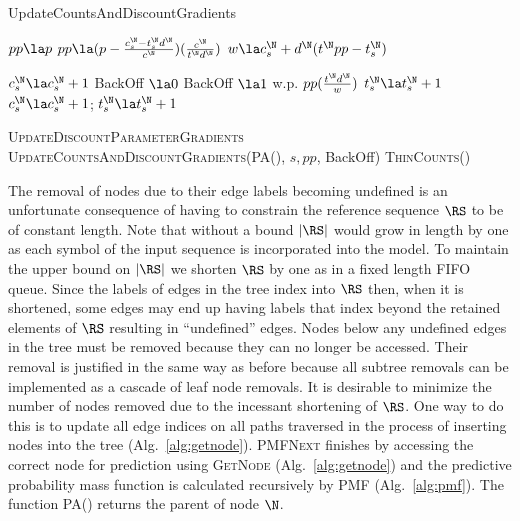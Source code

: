 \begin{algorithm}[t!]
	\caption{UpdateCountsAndDiscountGradients} \label{alg:updatecountsandgradients}
	\begin{algorithmic}[1]
	
		\State $pp \la p$
			\State $pp \la (p - \frac{c^\N_s - t^\N_s d^{\N}}{c^\N})(\frac{c^\N}{t^\N d^{\N}})$
			\State $w \la c^\N_s	+ d^\N (t^\N pp   - t^\N_s)$		
		\EndIf
		
			\State $c^\N_s \la c^\N_s + 1$
			\State BackOff $\la 0$
			\State BackOff $\la 1$ w.p. $pp (\frac{t^\N d^{\N}}{w})$ 
				\State $t^\N_s \la t^\N_s + 1$
			 \EndIf
				\State $c^\N_s \la c^\N_s + 1$;  $t^\N_s \la t^\N_s + 1$
		\EndIf
		
		\State \textsc{UpdateDiscountParameterGradients}%
		\State \textsc{UpdateCountsAndDiscountGradients}(\textsc{PA}(\N), $s,pp$, BackOff)
		\State \textsc{ThinCounts}(\N)
	\EndFunction
		\end{algorithmic}
\end{algorithm}


The removal of nodes due to their edge labels becoming undefined is an unfortunate consequence of having to constrain the reference sequence $\RS$ to be of constant length.  Note that without a bound $|\RS|$ would grow in length by one as each symbol of the input sequence is incorporated into the model.  To maintain the upper bound on $|\RS|$ we shorten $\RS$ by one as in a fixed length FIFO queue. Since the labels of edges in the tree index into $\RS$ then, when it is shortened, some edges may end up having labels that index beyond the retained elements of $\RS$ resulting in ``undefined'' edges.  Nodes below any undefined edges in the tree must be removed because they can no longer be accessed.  Their removal is justified in the same way as before because all subtree removals can be implemented as a cascade of leaf node removals.  It is desirable to minimize the number of nodes removed due to the incessant shortening of $\RS$.  One way to do this is to update all edge indices on all paths traversed in the process of inserting nodes into the tree (Alg.~\ref{alg:getnode}). %
\textsc{PMFNext} finishes by accessing the correct node for prediction using \textsc{GetNode} (Alg.~\ref{alg:getnode}) and the predictive probability mass function is calculated recursively by \textsc{PMF} (Alg.~\ref{alg:pmf}). The function \textsc{PA}(\N) returns the parent of node $\N$.

